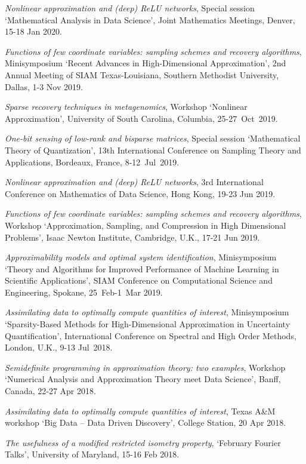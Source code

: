 \documentclass[11pt]{article}
\begin{document}
\item {\sl Nonlinear approximation and (deep) ReLU networks},
Special session `Mathematical Analysis in Data Science',
Joint Mathematics Meetings,
Denver, 15-18 Jan 2020.
\item {\sl Functions of few coordinate variables: sampling schemes and recovery algorithms},
Minisymposium  `Recent Advances in High-Dimensional Approximation',
2nd Annual Meeting of SIAM Texas-Louisiana,
Southern Methodist University, Dallas,
1-3 Nov 2019.
\item {\sl Sparse recovery techniques in metagenomics}, Workshop `Nonlinear Approximation',
University of South Carolina, Columbia, 25-27~Oct~2019.
\item {\sl One-bit sensing of low-rank and bisparse matrices}, 
Special session `Mathematical Theory of Quantization',
13th International Conference on Sampling Theory and Applications, 
Bordeaux, France,  \mbox{8-12~Jul~2019}.
\item {\sl Nonlinear approximation and (deep) ReLU networks},
3rd International Conference on Mathematics of Data Science,
Hong Kong, 19-23 Jun 2019.
\item {\sl Functions of few coordinate variables: sampling schemes and recovery algorithms},
 Workshop  `Approximation, Sampling, and Compression in High Dimensional Problems',
Isaac Newton Institute, Cambridge, U.K., 17-21 Jun 2019. 
\item {\sl Approximability models and optimal system identification}, Minisymposium `Theory and Algorithms for Improved Performance of Machine Learning in Scientific Applications',
SIAM Conference on Computational Science and Engineering, Spokane, 25~Feb-1~Mar 2019.
\item {\sl Assimilating data to optimally compute quantities of interest}, Minisymposium `Sparsity-Based \mbox{Methods} for High-Dimensional Approximation in Uncertainty Quantification',
International Conference on Spectral and High Order Methods,
London, U.K., 9-13 Jul~2018.
\item {\sl Semidefinite programming in approximation theory: two examples}, Workshop `Numerical Analysis and Approximation Theory meet Data Science', Banff, Canada, 22-27 Apr 2018.
\item {\sl Assimilating data to optimally compute quantities of interest}, 
Texas A\&M workshop `Big Data -- Data Driven Discovery', 
College Station, 20 Apr 2018.
\item {\sl The usefulness of a modified restricted isometry property}, `February Fourier Talks', University of Maryland, 15-16 Feb 2018.
\end{document}
